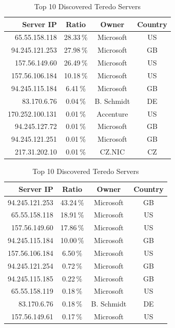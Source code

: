 \begin{table}
    \centering
    \begin{subtable}{\textwidth}
        \small
        \centering
        \begin{tabular}{rccc}
            \textbf{Server IP} & \textbf{Ratio} & \textbf{Owner} & \textbf{Country} \\ \toprule 
            65.55.158.118 & 28.33\,\% & Microsoft & US \\
            94.245.121.253 & 27.98\,\% & Microsoft & GB \\
            157.56.149.60 & 26.49\,\% & Microsoft & US \\
            157.56.106.184 & 10.18\,\% & Microsoft & US \\
            94.245.115.184 & 6.41\,\% & Microsoft & GB \\
            83.170.6.76 & 0.04\,\% & B. Schmidt & DE \\
            170.252.100.131 & 0.01\,\% & Accenture & US \\
            94.245.127.72 & 0.01\,\% & Microsoft & GB \\
            94.245.121.251 & 0.01\,\% & Microsoft & GB \\
            217.31.202.10 & 0.01\,\% & CZ.NIC & CZ \\ \bottomrule
        \end{tabular}
        \caption{Based on Teredo IPv6 Addresses}
        \label{tab:ipv6-tunnels-teredo-servers}
    \end{subtable}
    \par\medskip
    \begin{subtable}{\textwidth}
        \small
        \centering
        \begin{tabular}{rccc}
            \textbf{Server IP} & \textbf{Ratio} & \textbf{Owner} & \textbf{Country} \\ \toprule 
            94.245.121.253 & 43.24\,\% & Microsoft & GB \\
            65.55.158.118 & 18.91\,\% & Microsoft & US \\
            157.56.149.60 & 17.86\,\% & Microsoft & US \\
            94.245.115.184 & 10.00\,\% & Microsoft & GB \\
            157.56.106.184 & 6.50\,\% & Microsoft & US \\
            94.245.121.254 & 0.72\,\% & Microsoft & GB \\
            94.245.115.185 & 0.22\,\% & Microsoft & GB \\
            65.55.158.119 & 0.18\,\% & Microsoft & US \\
            83.170.6.76 & 0.18\,\% & B. Schmidt & DE \\
            157.56.149.61 & 0.17\,\% & Microsoft & US \\ \bottomrule
        \end{tabular}
        \caption{Based on UDP Port 3544}
        \label{tab:ipv6-tunnels-teredo-servers-3544}
    \end{subtable}
    \caption{Top 10 Discovered Teredo Servers}
\end{table}

